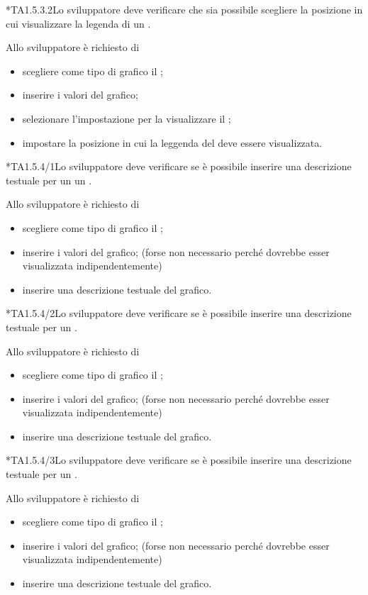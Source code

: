	*{TA1.5.3.2}Lo sviluppatore deve verificare che sia possibile scegliere la posizione in cui visualizzare la legenda di un .
			
		Allo sviluppatore è richiesto di
		\begin{itemize}
			\item scegliere come tipo di grafico il ;
			\item inserire i valori del grafico;
			\item selezionare l'impostazione per la visualizzare il ;
			\item impostare la posizione in cui la leggenda del  deve essere visualizzata.
		\end{itemize}

	*{TA1.5.4/1}Lo sviluppatore deve verificare se è possibile inserire una descrizione testuale per un un .

		Allo sviluppatore è richiesto di
		\begin{itemize}
			\item scegliere come tipo di grafico il ;
			\item inserire i valori del grafico; (forse non necessario perché dovrebbe esser visualizzata indipendentemente)
			\item inserire una descrizione testuale del grafico.
		\end{itemize}

	*{TA1.5.4/2}Lo sviluppatore deve verificare se è possibile inserire una descrizione testuale per un .

		Allo sviluppatore è richiesto di
		\begin{itemize}
			\item scegliere come tipo di grafico il ;
			\item inserire i valori del grafico; (forse non necessario perché dovrebbe esser visualizzata indipendentemente)
			\item inserire una descrizione testuale del grafico.
		\end{itemize}

	*{TA1.5.4/3}Lo sviluppatore deve verificare se è possibile inserire una descrizione testuale per un .

		Allo sviluppatore è richiesto di
		\begin{itemize}
			\item scegliere come tipo di grafico il ;
			\item inserire i valori del grafico; (forse non necessario perché dovrebbe esser visualizzata indipendentemente)
			\item inserire una descrizione testuale del grafico.
		\end{itemize}

